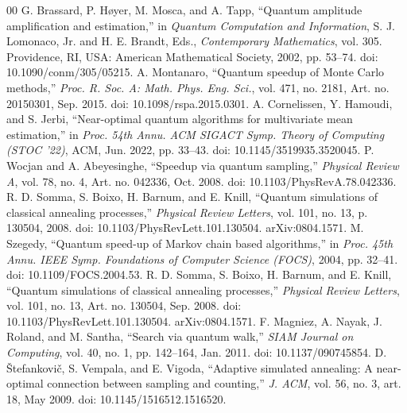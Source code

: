 \documentclass[10pt,conference]{IEEEtran}
\providecommand{\href}[2]{#2}
\theoremstyle{plain}
\theoremstyle{remark}
\begin{document}
\begin{thebibliography}{00}
 G. Brassard, P. H{\o}yer, M. Mosca, and A. Tapp, ``Quantum amplitude amplification and estimation,'' in \emph{Quantum Computation and Information}, S. J. Lomonaco, Jr. and H. E. Brandt, Eds., \emph{Contemporary Mathematics}, vol. 305. Providence, RI, USA: American Mathematical Society, 2002, pp. 53--74. doi: \href{https://doi.org/10.1090/conm/305/05215}{10.1090/conm/305/05215}.
 A. Montanaro, ``Quantum speedup of Monte Carlo methods,'' \emph{Proc. R. Soc. A: Math. Phys. Eng. Sci.}, vol. 471, no. 2181, Art. no. 20150301, Sep. 2015. doi: \href{https://doi.org/10.1098/rspa.2015.0301}{10.1098/rspa.2015.0301}.
 A. Cornelissen, Y. Hamoudi, and S. Jerbi, ``Near-optimal quantum algorithms for multivariate mean estimation,'' in \emph{Proc. 54th Annu. ACM SIGACT Symp. Theory of Computing (STOC '22)}, ACM, Jun. 2022, pp. 33--43. doi: \href{https://doi.org/10.1145/3519935.3520045}{10.1145/3519935.3520045}.
 P. Wocjan and A. Abeyesinghe, ``Speedup via quantum sampling,'' \emph{Physical Review A}, vol. 78, no. 4, Art. no. 042336, Oct. 2008. doi: \href{https://doi.org/10.1103/PhysRevA.78.042336}{10.1103/PhysRevA.78.042336}.
 R. D. Somma, S. Boixo, H. Barnum, and E. Knill, ``Quantum simulations of classical annealing processes,'' \emph{Physical Review Letters}, vol. 101, no. 13, p. 130504, 2008. doi: \href{https://doi.org/10.1103/PhysRevLett.101.130504}{10.1103/PhysRevLett.101.130504}. arXiv:\href{https://arxiv.org/abs/0804.1571}{0804.1571}.
 M. Szegedy, ``Quantum speed-up of Markov chain based algorithms,'' in \emph{Proc. 45th Annu. IEEE Symp. Foundations of Computer Science (FOCS)}, 2004, pp. 32--41. doi: \href{https://doi.org/10.1109/FOCS.2004.53}{10.1109/FOCS.2004.53}.
 R. D. Somma, S. Boixo, H. Barnum, and E. Knill, ``Quantum simulations of classical annealing processes,'' \emph{Physical Review Letters}, vol. 101, no. 13, Art. no. 130504, Sep. 2008. doi: \href{https://doi.org/10.1103/PhysRevLett.101.130504}{10.1103/PhysRevLett.101.130504}. arXiv:\href{https://arxiv.org/abs/0804.1571}{0804.1571}.
 F. Magniez, A. Nayak, J. Roland, and M. Santha, ``Search via quantum walk,'' \emph{SIAM Journal on Computing}, vol. 40, no. 1, pp. 142--164, Jan. 2011. doi: \href{https://doi.org/10.1137/090745854}{10.1137/090745854}.
 D. \v{S}tefankovi\v{c}, S. Vempala, and E. Vigoda, ``Adaptive simulated annealing: A near-optimal connection between sampling and counting,'' \emph{J. ACM}, vol. 56, no. 3, art. 18, May 2009. doi: \href{https://doi.org/10.1145/1516512.1516520}{10.1145/1516512.1516520}.

\end{thebibliography}
\end{document}
